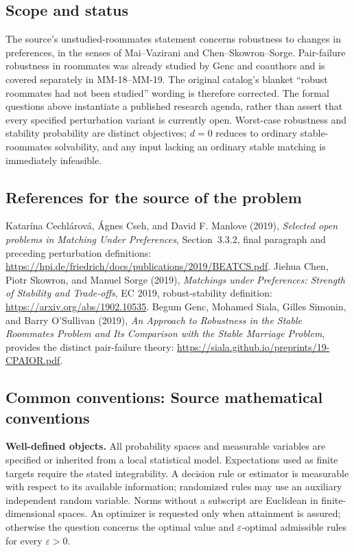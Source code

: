 \documentclass[11pt,a4paper]{article}
\begin{document}
\subsection*{Scope and status}
The source's unstudied-roommates statement concerns robustness to changes in preferences, in the senses of Mai--Vazirani and Chen--Skowron--Sorge. Pair-failure robustness in roommates was already studied by Genc and coauthors and is covered separately in MM-18--MM-19. The original catalog's blanket ``robust roommates had not been studied'' wording is therefore corrected. The formal questions above instantiate a published research agenda, rather than assert that every specified perturbation variant is currently open. Worst-case robustness and stability probability are distinct objectives; $d=0$ reduces to ordinary stable-roommates solvability, and any input lacking an ordinary stable matching is immediately infeasible.
\subsection*{References for the source of the problem}
Katar\'ina Cechl\'arov\'a, \'Agnes Cseh, and David F. Manlove (2019), \emph{Selected open problems in Matching Under Preferences}, Section~3.3.2, final paragraph and preceding perturbation definitions: \url{https://hpi.de/friedrich/docs/publications/2019/BEATCS.pdf}. Jiehua Chen, Piotr Skowron, and Manuel Sorge (2019), \emph{Matchings under Preferences: Strength of Stability and Trade-offs}, EC 2019, robust-stability definition: \url{https://arxiv.org/abs/1902.10535}. Begum Genc, Mohamed Siala, Gilles Simonin, and Barry O'Sullivan (2019), \emph{An Approach to Robustness in the Stable Roommates Problem and Its Comparison with the Stable Marriage Problem}, provides the distinct pair-failure theory: \url{https://siala.github.io/preprints/19-CPAIOR.pdf}.

\subsection*{Common conventions: Source mathematical conventions}

\textbf{Well-defined objects.}
All probability spaces and measurable variables are specified or inherited
from a local statistical model. Expectations used as finite targets require
the stated integrability. A decision rule or estimator is measurable with
respect to its available information; randomized rules may use an auxiliary
independent random variable. Norms without a subscript are Euclidean in
finite-dimensional spaces. An optimizer is requested only when attainment
is assured; otherwise the question concerns the optimal value and
$\varepsilon$-optimal admissible rules for every $\varepsilon>0$.
\end{document}
